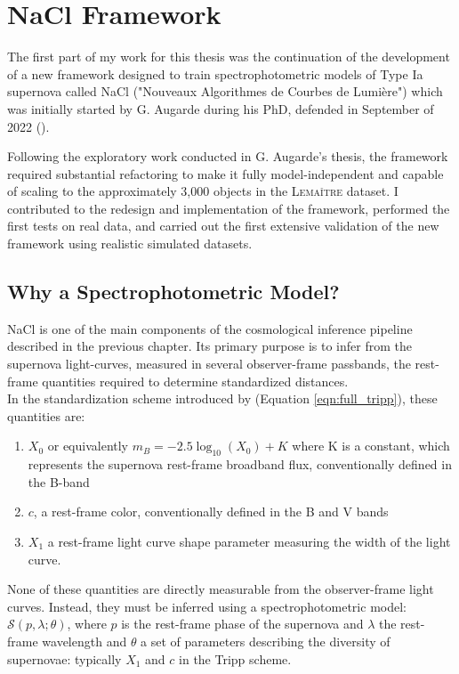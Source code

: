 \section{NaCl Framework}

The first part of my work for this thesis was the continuation of the development of a new framework designed to train spectrophotometric models of Type Ia supernova called 
NaCl ("Nouveaux Algorithmes de Courbes de Lumière") which was initially started by G. Augarde during his PhD, defended in September of 2022 (\cite{augar2022}).

Following the exploratory work conducted in G. Augarde’s thesis, the 
framework required substantial refactoring to make it fully 
model-independent and capable of scaling to the approximately 3,000 
objects in the \textsc{Lemaître} dataset. I contributed to the redesign and 
implementation of the framework, performed the first tests on real 
data, and carried out the first extensive validation of the new 
framework using realistic simulated datasets.  

\subsection{Why a Spectrophotometric Model? }


NaCl is one of the main components of the cosmological inference 
pipeline described in the previous chapter. Its primary purpose is to 
infer from the supernova light-curves, measured in several 
observer-frame passbands, the rest-frame quantities required to 
determine standardized distances. \\

In the standardization scheme introduced by \cite{Tripp_1999} (Equation \ref{eqn:full_tripp}), 
these quantities are:
\begin{enumerate}
    \item $X_0$ or equivalently $m_B = -2.5 \log_{10}(X_0) + K$ where K is a constant, which represents the supernova rest-frame broadband flux, conventionally defined in the B-band
    \item $c$, a rest-frame color, conventionally defined in the B and V bands
    \item $X_1$ a rest-frame light curve shape parameter measuring the width of the light curve.
\end{enumerate}

None of these quantities are directly measurable from the 
observer-frame light curves. Instead, they must be inferred using a 
spectrophotometric model: $\mathcal{S}(p, \lambda; \theta)$, where $p$ is 
the rest-frame phase of the supernova and $\lambda$ the rest-frame 
wavelength and $\theta$ a set of parameters describing the diversity 
of supernovae: typically $X_1$ and $c$ in the Tripp scheme. \\

